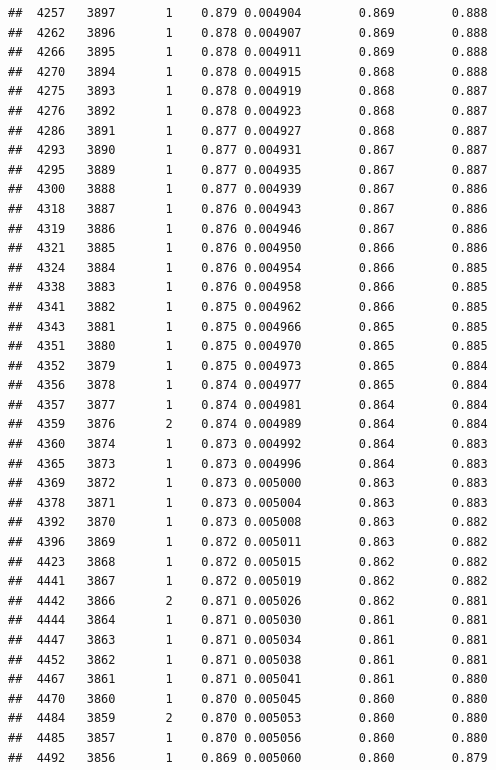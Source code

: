\documentclass[
]{book}
\begin{document}
\begin{verbatim}
##  4257   3897       1    0.879 0.004904        0.869        0.888
##  4262   3896       1    0.878 0.004907        0.869        0.888
##  4266   3895       1    0.878 0.004911        0.869        0.888
##  4270   3894       1    0.878 0.004915        0.868        0.888
##  4275   3893       1    0.878 0.004919        0.868        0.887
##  4276   3892       1    0.878 0.004923        0.868        0.887
##  4286   3891       1    0.877 0.004927        0.868        0.887
##  4293   3890       1    0.877 0.004931        0.867        0.887
##  4295   3889       1    0.877 0.004935        0.867        0.887
##  4300   3888       1    0.877 0.004939        0.867        0.886
##  4318   3887       1    0.876 0.004943        0.867        0.886
##  4319   3886       1    0.876 0.004946        0.867        0.886
##  4321   3885       1    0.876 0.004950        0.866        0.886
##  4324   3884       1    0.876 0.004954        0.866        0.885
##  4338   3883       1    0.876 0.004958        0.866        0.885
##  4341   3882       1    0.875 0.004962        0.866        0.885
##  4343   3881       1    0.875 0.004966        0.865        0.885
##  4351   3880       1    0.875 0.004970        0.865        0.885
##  4352   3879       1    0.875 0.004973        0.865        0.884
##  4356   3878       1    0.874 0.004977        0.865        0.884
##  4357   3877       1    0.874 0.004981        0.864        0.884
##  4359   3876       2    0.874 0.004989        0.864        0.884
##  4360   3874       1    0.873 0.004992        0.864        0.883
##  4365   3873       1    0.873 0.004996        0.864        0.883
##  4369   3872       1    0.873 0.005000        0.863        0.883
##  4378   3871       1    0.873 0.005004        0.863        0.883
##  4392   3870       1    0.873 0.005008        0.863        0.882
##  4396   3869       1    0.872 0.005011        0.863        0.882
##  4423   3868       1    0.872 0.005015        0.862        0.882
##  4441   3867       1    0.872 0.005019        0.862        0.882
##  4442   3866       2    0.871 0.005026        0.862        0.881
##  4444   3864       1    0.871 0.005030        0.861        0.881
##  4447   3863       1    0.871 0.005034        0.861        0.881
##  4452   3862       1    0.871 0.005038        0.861        0.881
##  4467   3861       1    0.871 0.005041        0.861        0.880
##  4470   3860       1    0.870 0.005045        0.860        0.880
##  4484   3859       2    0.870 0.005053        0.860        0.880
##  4485   3857       1    0.870 0.005056        0.860        0.880
##  4492   3856       1    0.869 0.005060        0.860        0.879

\end{verbatim}
\end{document}

